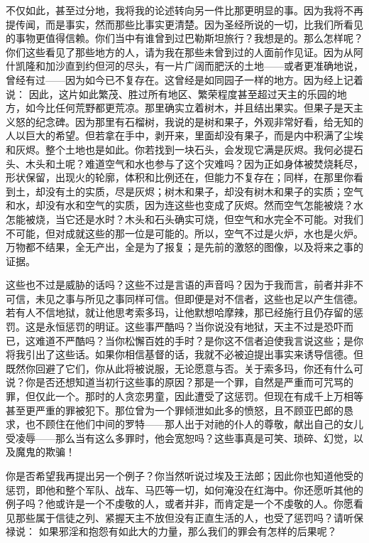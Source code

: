 不仅如此，甚至过分地，我将我的论述转向另一件比那更明显的事。因为我将不再提传闻，而是事实，然而那些比事实更清楚。因为圣经所说的一切，比我们所看见的事物更值得信赖。你们当中有谁曾到过巴勒斯坦旅行？我想是的。那么怎样呢？你们这些看见了那些地方的人，请为我在那些未曾到过的人面前作见证。因为从阿什凯隆和加沙直到约但河的尽头，有一片广阔而肥沃的土地——或者更准确地说，曾经有过——因为如今已不复存在。这曾经是如同园子一样的地方。因为经上记着说： 因此，这片如此繁茂、胜过所有地区、繁荣程度甚至超过天主的乐园的地方，如今比任何荒野都更荒凉。那里确实立着树木，并且结出果实。但果子是天主义怒的纪念碑。因为那里有石榴树，我说的是树和果子，外观非常好看，给无知的人以巨大的希望。但若拿在手中，剥开来，里面却没有果子，而是内中积满了尘埃和灰烬。整个土地也是如此。你若找到一块石头，会发现它满是灰烬。我何必提石头、木头和土呢？难道空气和水也参与了这个灾难吗？因为正如身体被焚烧耗尽，形状保留，出现火的轮廓，体积和比例还在，但能力不复存在；同样，在那里你看到土，却没有土的实质，尽是灰烬；树木和果子，却没有树木和果子的实质；空气和水，却没有水和空气的实质，因为连这些也变成了灰烬。然而空气怎能被烧？水怎能被烧，当它还是水时？木头和石头确实可烧，但空气和水完全不可能。对我们不可能，但对成就这些的那一位是可能的。所以，空气不过是火炉，水也是火炉。万物都不结果，全无产出，全是为了报复；是先前的激怒的图像，以及将来之事的证据。\par

这些也不过是威胁的话吗？这些不过是言语的声音吗？因为于我而言，前者并非不可信，未见之事与所见之事同样可信。但即便是对不信者，这些也足以产生信德。若有人不信地狱，就让他思考索多玛，让他默想哈摩辣，那已经施行且仍存留的惩罚。这是永恒惩罚的明证。这些事严酷吗？当你说没有地狱，天主不过是恐吓而已，这难道不严酷吗？当你松懈百姓的手时？是你这不信者迫使我言说这些；是你将我引出了这些话。如果你相信基督的话，我就不必被迫提出事实来诱导信德。但既然你回避了它们，你从此将被说服，无论愿意与否。关于索多玛，你还有什么可说？你是否还想知道当初行这些事的原因？那是一个罪，自然是严重而可咒骂的罪，但仅此一个。那时的人贪恋男童，因此遭受了这惩罚。但现在有成千上万相等甚至更严重的罪被犯下。那位曾为一个罪倾泄如此多的愤怒，且不顾亚巴郎的恳求，也不顾住在他们中间的罗特——那人出于对祂的仆人的尊敬，献出自己的女儿受凌辱——那么当有这么多罪时，他会宽恕吗？这些事真是可笑、琐碎、幻觉，以及魔鬼的欺骗！\par

你是否希望我再提出另一个例子？你当然听说过埃及王法郎；因此你也知道他受的惩罚，即他和整个军队、战车、马匹等一切，如何淹没在红海中。你还愿听其他的例子吗？他或许是一个不虔敬的人，或者并非，而肯定是一个不虔敬的人。你愿看见那些属于信徒之列、紧握天主不放但没有正直生活的人，也受了惩罚吗？请听保禄说： 如果邪淫和抱怨有如此大的力量，那么我们的罪会有怎样的后果呢？\par

